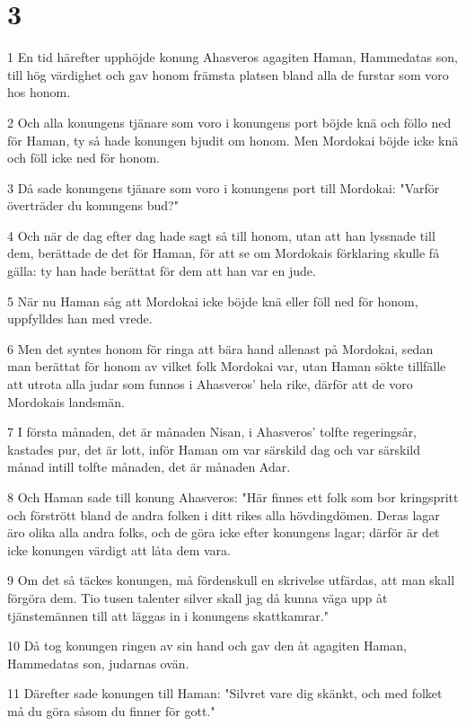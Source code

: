 \chapter{3}

\par 1 En tid härefter upphöjde konung Ahasveros agagiten Haman, Hammedatas son, till hög värdighet och gav honom främsta platsen bland alla de furstar som voro hos honom.
\par 2 Och alla konungens tjänare som voro i konungens port böjde knä och föllo ned för Haman, ty så hade konungen bjudit om honom. Men Mordokai böjde icke knä och föll icke ned för honom.
\par 3 Då sade konungens tjänare som voro i konungens port till Mordokai: "Varför överträder du konungens bud?"
\par 4 Och när de dag efter dag hade sagt så till honom, utan att han lyssnade till dem, berättade de det för Haman, för att se om Mordokais förklaring skulle få gälla: ty han hade berättat för dem att han var en jude.
\par 5 När nu Haman såg att Mordokai icke böjde knä eller föll ned för honom, uppfylldes han med vrede.
\par 6 Men det syntes honom för ringa att bära hand allenast på Mordokai, sedan man berättat för honom av vilket folk Mordokai var, utan Haman sökte tillfälle att utrota alla judar som funnos i Ahasveros' hela rike, därför att de voro Mordokais landsmän.
\par 7 I första månaden, det är månaden Nisan, i Ahasveros' tolfte regeringsår, kastades pur, det är lott, inför Haman om var särskild dag och var särskild månad intill tolfte månaden, det är månaden Adar.
\par 8 Och Haman sade till konung Ahasveros: "Här finnes ett folk som bor kringspritt och förstrött bland de andra folken i ditt rikes alla hövdingdömen. Deras lagar äro olika alla andra folks, och de göra icke efter konungens lagar; därför är det icke konungen värdigt att låta dem vara.
\par 9 Om det så täckes konungen, må fördenskull en skrivelse utfärdas, att man skall förgöra dem. Tio tusen talenter silver skall jag då kunna väga upp åt tjänstemännen till att läggas in i konungens skattkamrar."
\par 10 Då tog konungen ringen av sin hand och gav den åt agagiten Haman, Hammedatas son, judarnas ovän.
\par 11 Därefter sade konungen till Haman: "Silvret vare dig skänkt, och med folket må du göra såsom du finner för gott."
